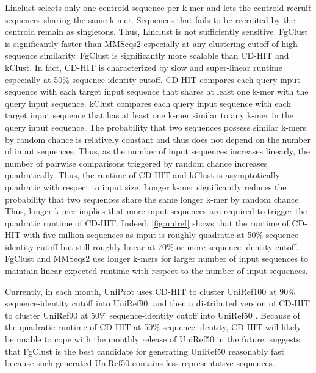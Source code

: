 \documentclass[11pt,letterpaper]{article}
\begin{document}
Linclust selects only one centroid sequence per k-mer and lets the centroid recruit sequences sharing the same k-mer.
Sequences that fails to be recruited by the centroid remain as singletons.
Thus, Linclust is not sufficiently sensitive.
FgClust is significantly faster than MMSeqs2 especially at any clustering cutoff of high sequence similarity.
FgClust is significantly more scalable than CD-HIT and kClust. 
In fact, CD-HIT is characterized by slow and super-linear runtime especially at 50\% sequence-identity cutoff.
CD-HIT compares each query input sequence with each target input sequence that shares at least one k-mer with the query input sequence.
kClust compares each query input sequence with each target input sequence that has at least one k-mer similar to any k-mer in the query input sequence.
The probability that two sequences possess similar k-mers by random chance is relatively constant and thus does not depend on the number of input sequences.
Thus, as the number of input sequences increases linearly, the number of pairwise comparisons triggered by random chance increases quadratically.
Thus, the runtime of CD-HIT and kClust is asymptotically quadratic with respect to input size.
Longer k-mer significantly reduces the probability that two sequences share the same longer k-mer by random chance.
Thus, longer k-mer implies that more input sequences are required to trigger the quadratic runtime of CD-HIT.
Indeed, \cref{fig:uniref} shows that the runtime of CD-HIT with five million sequences as input is roughly quadratic at 50\% sequence-identity cutoff but still roughly linear at 70\% or more sequence-identity cutoff.
FgClust and MMSeqs2 use longer k-mers for larger number of input sequences to maintain linear expected runtime with respect to the number of input sequences.

Currently, in each month, UniProt uses CD-HIT to cluster UniRef100 at 90\% sequence-identity cutoff into UniRef90, and then a distributed version of CD-HIT to cluster UniRef90 at 50\% sequence-identity cutoff into UniRef50 \citep{suzek2014uniref}.
Because of the quadratic runtime of CD-HIT at 50\% sequence-identity, CD-HIT will likely be unable to cope with the monthly release of UniRef50 in the future.
 suggests that FgClust is the best candidate for generating UniRef50 reasonably fast because such generated UniRef50 contains less representative sequences.
\end{document}
